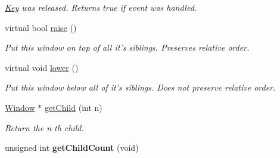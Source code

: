 \begin{DoxyCompactItemize}
\begin{DoxyCompactList}\small\item\em \hyperlink{classGUI_1_1Key}{Key} was released. Returns true if event was handled. \end{DoxyCompactList}\item 
virtual bool \hyperlink{classGUI_1_1Window_a90890951f6ce5f043657756b2691e754}{raise} ()
\begin{DoxyCompactList}\small\item\em Put this window on top of all it's siblings. Preserves relative order. \end{DoxyCompactList}\item 
\hypertarget{classGUI_1_1Window_a56f2e317a40e65fe867084e5531b19bd}{virtual void \hyperlink{classGUI_1_1Window_a56f2e317a40e65fe867084e5531b19bd}{lower} ()}\label{classGUI_1_1Window_a56f2e317a40e65fe867084e5531b19bd}

\begin{DoxyCompactList}\small\item\em Put this window below all of it's siblings. Does not preserve relative order. \end{DoxyCompactList}\item 
\hypertarget{classGUI_1_1Window_a546dab2fb4ebde2b393465a0962eda8f}{\hyperlink{classGUI_1_1Window}{Window} $\ast$ \hyperlink{classGUI_1_1Window_a546dab2fb4ebde2b393465a0962eda8f}{get\-Child} (int n)}\label{classGUI_1_1Window_a546dab2fb4ebde2b393465a0962eda8f}

\begin{DoxyCompactList}\small\item\em Return the {\ttfamily n} th child. \end{DoxyCompactList}\item 
\hypertarget{classGUI_1_1Window_ab715a814dd0b6995cde40cf4c2b03355}{unsigned int {\bfseries get\-Child\-Count} (void)}\label{classGUI_1_1Window_ab715a814dd0b6995cde40cf4c2b03355}

\end{DoxyCompactItemize}
